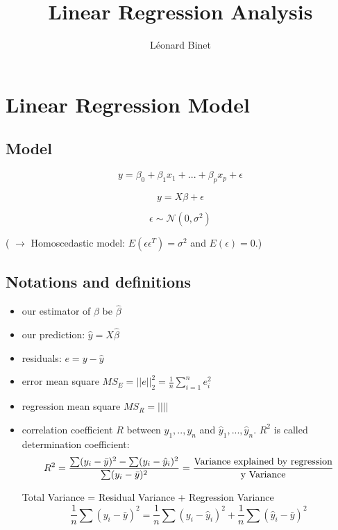 \documentclass[a4paper]{article}
\title{Linear Regression Analysis}
\author{Léonard Binet}
\theoremstyle{plain}
\begin{document}
\maketitle

\begin{abstract}

\end{abstract}

\tableofcontents



\pagebreak

\section{Linear Regression Model}
\subsection{Model}

$$ y = \beta_0 + \beta_1 x_1 + ... + \beta_p x_p + \epsilon$$

$$ y = X\beta + \epsilon$$

$$\epsilon \sim \mathcal{N} (0,\sigma^2) $$ 

( $\rightarrow$ Homoscedastic model: $E(\epsilon \epsilon^T)=\sigma^2$ and $E(\epsilon)=0$.)


\subsection{Notations and definitions}

\begin{itemize}
\item our estimator of $\beta$ be $\hat \beta$
\item our prediction: $ \hat y = X \hat \beta$
\item residuals: $ e = y-\hat y $
\item error mean square $MS_E = ||e||^2_2=\frac{1}{n}\sum_{i=1}^n e_i^2$
\item regression mean square $MS_R = ||||$
\item correlation coefficient $R$ between $y_1,..,y_n$ and $\hat y_1,...,\hat y_n$. $R^2$ is called determination coefficient:
$$ R^2 = \frac{
\sum (y_i - \bar y)^2 
- \sum (y_i - \hat y_i)^2 }
{\sum (y_i - \bar y)^2}
= \frac{\textnormal{Variance explained by regression}}{\textnormal{y Variance}}
$$

Total Variance = Residual Variance + Regression Variance
$$
\frac{1}{n} \sum (y_i - \bar y)^2 = 
\frac{1}{n} \sum (y_i - \hat y_i)^2 + 
\frac{1}{n} \sum (\hat y_i - \bar y)^2 
$$
\end{itemize}
\end{document}
